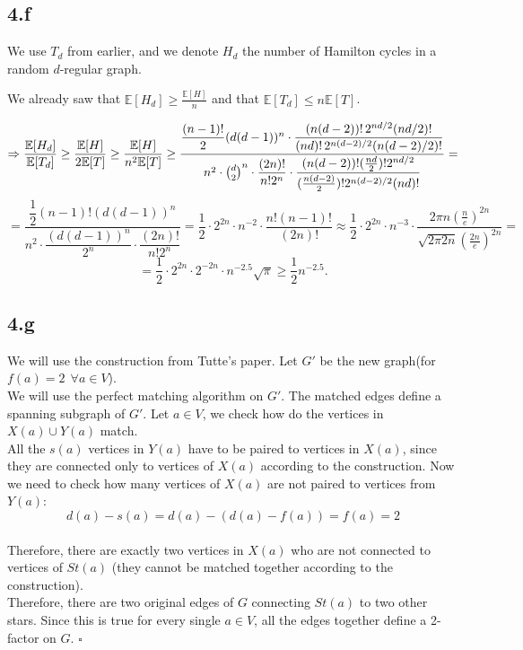 \documentclass{article}
\begin{document}
\subsection*{4.f}
We use $T_d$ from earlier, and we denote $H_d$ the number of Hamilton cycles in a random $d$-regular graph. 

We already saw that $\mathbb{E}[H_d]\geq\frac{\mathbb{E}[H]}{n}$ and that $\mathbb{E}[T_d]\leq{n\mathbb{E}[T]}$.

\[\Rightarrow\frac{\mathbb{E}[H_d]}{\mathbb{E}[T_d]}\geq\frac{\mathbb{E}[H]}{2\mathbb{E}[T]}
\geq
\frac{\mathbb{E}[H]}{n^2 \mathbb{E}[T]} \\[2mm]
\geq
\frac{
\dfrac{(n-1)!}{2} (d(d-1))^n \cdot
\dfrac{(n(d-2))! \, 2^{nd/2} (nd/2)!}{(nd)! \, 2^{n(d-2)/2} (n(d-2)/2)!}
}{
n^2 \cdot \binom{d}{2}^n \cdot 
\dfrac{(2n)!}{n! 2^n} \cdot 
\dfrac{(n(d-2))! (\tfrac{nd}{2})! 2^{nd/2}}{(\tfrac{n(d-2)}{2})! 2^{n(d-2)/2} (nd)!}
}
=\]\[=
\frac{
\dfrac{1}{2} (n-1)! (d(d-1))^n
}{
n^2 \cdot \dfrac{(d(d-1))^n}{2^n} \cdot \dfrac{(2n)!}{n! 2^n}
}
=\frac{1}{2}\cdot2^{2n}\cdot n^{-2}\cdot\frac{n!(n-1)!}{(2n)!
}
\approx\frac{1}{2}\cdot2^{2n}\cdot n^{-3}\cdot\frac{2\pi n(\frac{n}{e})^{2n}}{\sqrt{2\pi 2n}(\frac{2n}{e})^{2n}
}
=\]\[=\frac{1}{2}\cdot2^{2n}\cdot2^{-2n}\cdot n^{-2.5}\sqrt{\pi
}
\geq\frac{1}{2} n^{-2.5}.\]

\subsection*{4.g}
We will use the construction from Tutte's paper. Let $G'$ be the new graph(for $f(a)=2\  \ \forall a \in V$).\\
We will use the perfect matching algorithm on $G'$. The matched edges define a spanning subgraph of $G'$.
Let $a \in V$, we check how do the vertices in $X(a)\cup Y(a)$ match.\\
All the $s(a)$ vertices in $Y(a)$ have to be paired to vertices in $X(a)$, since they are connected only to vertices of $X(a)$ according to the construction. Now we need to check how many vertices of $X(a)$ are not paired to vertices from $Y(a)$:\\
\[
d(a)-s(a)=d(a)-(d(a)-f(a))=f(a)=2
\]\\
Therefore, there are exactly two vertices in $X(a)$ who are not connected to vertices of $St(a)$ (they cannot be matched together according to the construction).\\
Therefore, there are two original edges of $G$ connecting $St(a)$ to two other stars. Since this is true for every single $a \in V$, all the edges together define a 2-factor on $G$.
\hfill $\square$
\end{document}
